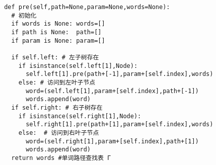 \documentclass[master,openright,oneside,color]{../buaathesis}
\begin{document}
\begin{verbatim}
 def pre(self,path=None,param=None,words=None):
   # 初始化
   if words is None: words=[]
   if path is None:  path=[]
   if param is None: param=[]

   if self.left: # 左子树存在
     if isinstance(self.left[1],Node):
       self.left[1].pre(path+[-1],param+[self.index],words)
     else: # 访问到左叶子节点
       word=(self.left[1],param+[self.index],path+[-1])
       words.append(word)
   if self.right: # 右子树存在
     if isinstance(self.right[1],Node):
       self.right[1].pre(path+[1],param+[self.index],words)
     else:  # 访问到右叶子节点
       word=(self.right[1],param+[self.index],path+[1])
       words.append(word)
   return words #单词路径查找表 Γ
\end{verbatim}
\end{document}
